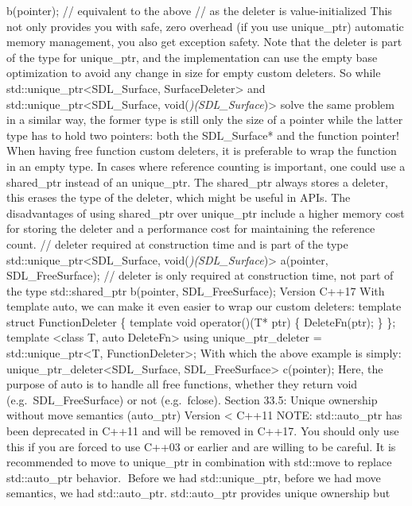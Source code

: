 b(pointer); // equivalent to the above // as the deleter is
value-initialized This not only provides you with safe, zero overhead
(if you use unique\_ptr) automatic memory management, you also get
exception safety. Note that the deleter is part of the type for
unique\_ptr, and the implementation can use the empty base optimization
to avoid any change in size for empty custom deleters. So while
std::unique\_ptr\textless SDL\_Surface, SurfaceDeleter\textgreater{} and
std::unique\_ptr\textless SDL\_Surface,
void(\emph{)(SDL\_Surface})\textgreater{} solve the same problem in a
similar way, the former type is still only the size of a pointer while
the latter type has to hold two pointers: both the SDL\_Surface* and the
function pointer! When having free function custom deleters, it is
preferable to wrap the function in an empty type. In cases where
reference counting is important, one could use a shared\_ptr instead of
an unique\_ptr. The shared\_ptr always stores a deleter, this erases the
type of the deleter, which might be useful in APIs. The disadvantages of
using shared\_ptr over unique\_ptr include a higher memory cost for
storing the deleter and a performance cost for maintaining the reference
count. // deleter required at construction time and is part of the type
std::unique\_ptr\textless SDL\_Surface,
void(\emph{)(SDL\_Surface})\textgreater{} a(pointer, SDL\_FreeSurface);
// deleter is only required at construction time, not part of the type
std::shared\_ptr b(pointer, SDL\_FreeSurface); Version C++17 With
template auto, we can make it even easier to wrap our custom deleters:
template struct FunctionDeleter \{ template void operator()(T* ptr) \{
DeleteFn(ptr); \} \}; template \textless class T, auto
DeleteFn\textgreater{} using unique\_ptr\_deleter =
std::unique\_ptr\textless T, FunctionDeleter\textgreater; With which the
above example is simply: unique\_ptr\_deleter\textless SDL\_Surface,
SDL\_FreeSurface\textgreater{} c(pointer); Here, the purpose of auto is
to handle all free functions, whether they return void
(e.g.~SDL\_FreeSurface) or not (e.g.~fclose). Section 33.5: Unique
ownership without move semantics (auto\_ptr) Version \textless{} C++11
NOTE: std::auto\_ptr has been deprecated in C++11 and will be removed in
C++17. You should only use this if you are forced to use C++03 or
earlier and are willing to be careful. It is recommended to move to
unique\_ptr in combination with std::move to replace std::auto\_ptr
behavior. Before we had std::unique\_ptr, before we had move semantics,
we had std::auto\_ptr. std::auto\_ptr provides unique ownership but
